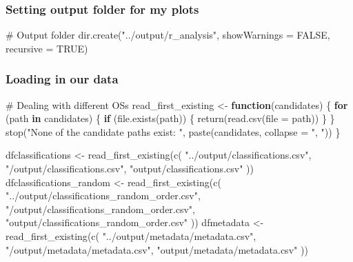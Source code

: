 \documentclass[
  letterpaper,
  DIV=11,
  numbers=noendperiod]{scrartcl}
\newenvironment{Shaded}{\begin{snugshade}}{\end{snugshade}}
\newcommand{\AttributeTok}[1]{\textcolor[rgb]{0.40,0.45,0.13}{#1}}
\newcommand{\CommentTok}[1]{\textcolor[rgb]{0.37,0.37,0.37}{#1}}
\newcommand{\ConstantTok}[1]{\textcolor[rgb]{0.56,0.35,0.01}{#1}}
\newcommand{\ControlFlowTok}[1]{\textcolor[rgb]{0.00,0.23,0.31}{\textbf{#1}}}
\newcommand{\FunctionTok}[1]{\textcolor[rgb]{0.28,0.35,0.67}{#1}}
\newcommand{\NormalTok}[1]{\textcolor[rgb]{0.00,0.23,0.31}{#1}}
\newcommand{\OtherTok}[1]{\textcolor[rgb]{0.00,0.23,0.31}{#1}}
\newcommand{\StringTok}[1]{\textcolor[rgb]{0.13,0.47,0.30}{#1}}
\begin{document}
\subsubsection{Setting output folder for my
plots}\label{setting-output-folder-for-my-plots}

\begin{Shaded}
\begin{Highlighting}[]
\CommentTok{\# Output folder}
\FunctionTok{dir.create}\NormalTok{(}\StringTok{"../output/r\_analysis"}\NormalTok{, }\AttributeTok{showWarnings =} \ConstantTok{FALSE}\NormalTok{, }\AttributeTok{recursive =} \ConstantTok{TRUE}\NormalTok{)}
\end{Highlighting}
\end{Shaded}

\subsubsection{Loading in our data}\label{loading-in-our-data}

\begin{Shaded}
\begin{Highlighting}[]
\CommentTok{\# Dealing with different OSs }
\NormalTok{read\_first\_existing }\OtherTok{\textless{}{-}} \ControlFlowTok{function}\NormalTok{(candidates) \{}
  \ControlFlowTok{for}\NormalTok{ (path }\ControlFlowTok{in}\NormalTok{ candidates) \{}
    \ControlFlowTok{if}\NormalTok{ (}\FunctionTok{file.exists}\NormalTok{(path)) \{}
      \FunctionTok{return}\NormalTok{(}\FunctionTok{read.csv}\NormalTok{(}\AttributeTok{file =}\NormalTok{ path))}
\NormalTok{    \}}
\NormalTok{  \}}
  \FunctionTok{stop}\NormalTok{(}\StringTok{"None of the candidate paths exist: "}\NormalTok{, }\FunctionTok{paste}\NormalTok{(candidates, }\AttributeTok{collapse =} \StringTok{", "}\NormalTok{))}
\NormalTok{\}}

\NormalTok{dfclassifications }\OtherTok{\textless{}{-}} \FunctionTok{read\_first\_existing}\NormalTok{(}\FunctionTok{c}\NormalTok{(}
  \StringTok{"../output/classifications.csv"}\NormalTok{,}
  \StringTok{"/output/classifications.csv"}\NormalTok{,}
  \StringTok{"output/classifications.csv"}
\NormalTok{))}
\NormalTok{dfclassifications\_random }\OtherTok{\textless{}{-}} \FunctionTok{read\_first\_existing}\NormalTok{(}\FunctionTok{c}\NormalTok{(}
  \StringTok{"../output/classifications\_random\_order.csv"}\NormalTok{,}
  \StringTok{"/output/classifications\_random\_order.csv"}\NormalTok{,}
  \StringTok{"output/classifications\_random\_order.csv"}
\NormalTok{))}
\NormalTok{dfmetadata }\OtherTok{\textless{}{-}} \FunctionTok{read\_first\_existing}\NormalTok{(}\FunctionTok{c}\NormalTok{(}
  \StringTok{"../output/metadata/metadata.csv"}\NormalTok{,}
  \StringTok{"/output/metadata/metadata.csv"}\NormalTok{,}
  \StringTok{"output/metadata/metadata.csv"}
\NormalTok{))}
\end{Highlighting}
\end{Shaded}
\end{document}
